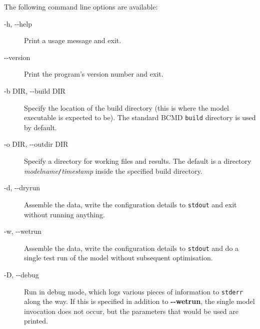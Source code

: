 \documentclass[a4paper,11pt]{article}
\begin{document}
The following command line options are available:
\begin{adjustwidth}{0.8cm}{0.8cm}
\begin{description}
\item[-h, -{}-help] Print a usage message and exit.
\item[-{}-version] Print the program's version number and exit.
\item[-b DIR, -{}-build DIR] Specify the location of the build directory (this is where the model executable is expected to be). The standard BCMD \texttt{build} directory is used by default.
\item[-o DIR, -{}-outdir DIR] Specify a directory for working files and results. The default is a directory \textit{modelname}\texttt{/}\textit{timestamp} inside the specified build directory.
\item[-d, -{}-dryrun] Assemble the data, write the configuration details to \texttt{stdout} and exit without running anything.
\item[-w, -{}-wetrun] Assemble the data, write the configuration details to \texttt{stdout} and do a single test run of the model without subsequent optimisation.
\item[-D, -{}-debug] Run in debug mode, which logs various pieces of information to \texttt{stderr} along the way. If this is specified in addition to \textbf{-{}-wetrun}, the single model invocation does not occur, but the parameters that would be used are printed.
\end{description}
\end{adjustwidth}
\end{document}

